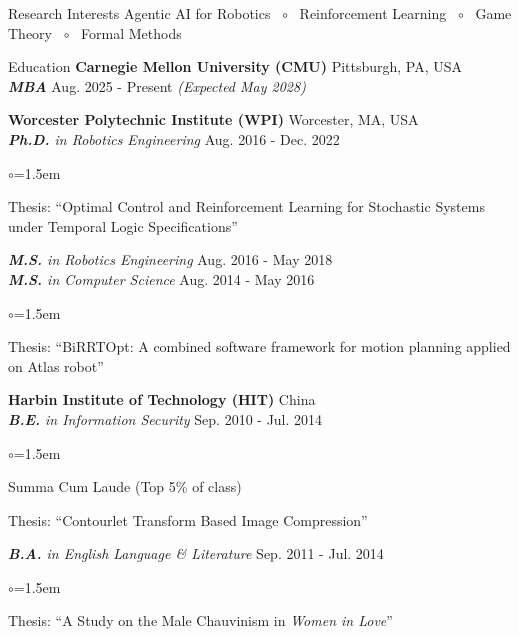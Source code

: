 \documentclass{resume} %
\begin{document}


\begin{rSection}{Research Interests}
Agentic AI for Robotics \, $\circ$ \,
Reinforcement Learning \, $\circ$ \,
Game Theory \, $\circ$ \,
Formal Methods
\end{rSection}

\begin{rSection}{Education}
{\bf Carnegie Mellon University (CMU)} \hfill {Pittsburgh, PA, USA} \\
{\em{\bf MBA}} \hfill Aug. 2025 - Present {\em (Expected May 2028)}

{\bf Worcester Polytechnic Institute (WPI)} \hfill {Worcester, MA, USA} \\
{\em{\bf Ph.D.} in Robotics Engineering} \hfill Aug. 2016 - Dec. 2022
\begin{list}{$\circ$}{\leftmargin=1.5em}
\item Thesis: ``Optimal Control and Reinforcement Learning for Stochastic Systems under Temporal Logic Specifications''
\end{list}

{\em{\bf M.S.} in Robotics Engineering} \hfill Aug. 2016 - May 2018 \\
{\em{\bf M.S.} in Computer Science} \hfill Aug. 2014 - May 2016
\begin{list}{$\circ$}{\leftmargin=1.5em}
\item Thesis: ``BiRRTOpt: A combined software framework for motion planning applied on Atlas robot''
\end{list}

{\bf Harbin Institute of Technology (HIT)} \hfill {China} \\
{\em{\bf B.E.} in Information Security} \hfill Sep. 2010 - Jul. 2014
\begin{list}{$\circ$}{\leftmargin=1.5em}
\item Summa Cum Laude (Top 5\% of class) \vspace{-0.5em}
\item Thesis: ``Contourlet Transform Based Image Compression''
\end{list}

{\em{\bf B.A.} in English Language \& Literature} \hfill Sep. 2011 - Jul. 2014
\begin{list}{$\circ$}{\leftmargin=1.5em}
\item Thesis: ``A Study on the Male Chauvinism in \emph{Women in Love}''
\end{list}
\end{rSection}
\end{document}
